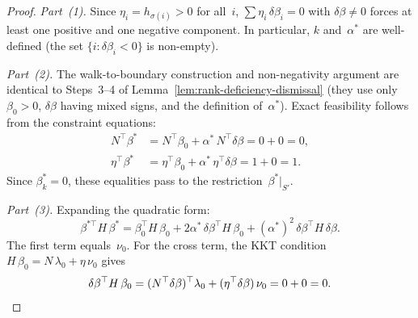 \begin{proof}
\emph{Part~(1).}
Since $\eta_i = h_{\sigma(i)} > 0$ for all~$i$,
$\sum \eta_i\,\delta\beta_i = 0$ with $\delta\beta \neq 0$
forces at least one positive and one negative component.
In particular, $k$ and~$\alpha^*$ are well-defined
(the set $\{i : \delta\beta_i < 0\}$ is non-empty).

\emph{Part~(2).}
The walk-to-boundary construction and non-negativity argument
are identical to Steps~3--4 of
Lemma~\ref{lem:rank-deficiency-dismissal}
(they use only $\beta_0 > 0$, $\delta\beta$ having mixed signs,
and the definition of~$\alpha^*$).
Exact feasibility follows from the constraint equations:
\begin{align*}
  N^\top\beta^*
  &= N^\top\beta_0 + \alpha^*\,N^\top\delta\beta
  = 0 + 0 = 0, \\
  \eta^\top\beta^*
  &= \eta^\top\beta_0 + \alpha^*\,\eta^\top\delta\beta
  = 1 + 0 = 1.
\end{align*}
Since $\beta^*_k = 0$, these equalities pass to the
restriction~$\beta^*|_{S'}$.

\emph{Part~(3).}
Expanding the quadratic form:
\[
  \beta^{*\top} H\,\beta^*
  = \beta_0^\top H\,\beta_0
    + 2\alpha^*\,\delta\beta^\top H\,\beta_0
    + (\alpha^*)^2\,\delta\beta^\top H\,\delta\beta.
\]
The first term equals~$\nu_0$.
For the cross term, the KKT condition
$H\,\beta_0 = N\,\lambda_0 + \eta\,\nu_0$ gives
\[
  \delta\beta^\top H\,\beta_0
  = (N^\top\delta\beta)^\top\lambda_0
    + (\eta^\top\delta\beta)\,\nu_0
  = 0 + 0 = 0. \qedhere
\]
\end{proof}

